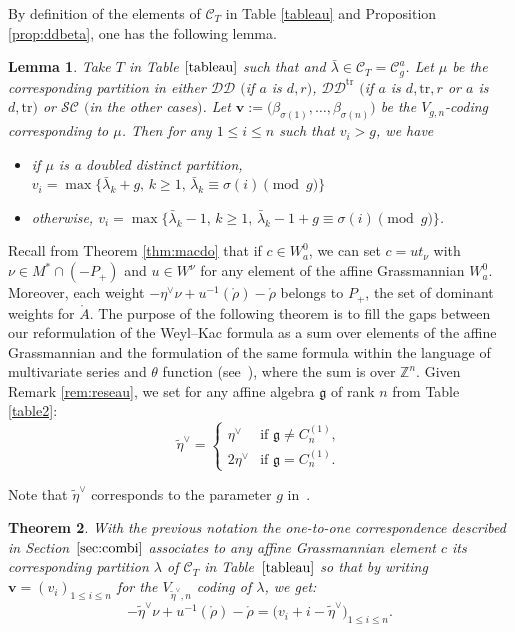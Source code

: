 \documentclass[10pt,a4paper]{amsart}
\newtheorem{Theorem}{Theorem}[section]
\newtheorem{Lemma}[Theorem]{Lemma}
\numberwithin{equation}{section}
\newcommand{\cC}{\mathcal{C}}
\def\ccsc{\mathcal {SC}}
\def\ccdd{\mathcal {DD}}
\newcommand{\Z}{\mathbb{Z}}
\begin{document}
By definition of the elements of $\cC_T$ in Table \ref{tableau} and Proposition \ref{prop:ddbeta}, one has the following lemma.

\begin{Lemma}%
Take $T$ in Table $\ref{tableau}$ such that  and $\bar{\lambda}\in\cC_T=\cC_{g}^{a}$. Let $\mu$ be the corresponding partition in either $\ccdd$ $($if $a$ is $d,r)$, $\ccdd^{\mathrm{tr}}$ $($if $a$ is $d,\mathrm{tr},r$ or $a$ is $d,\mathrm{tr})$ or $\ccsc$ $($in the other cases$)$. Let $\mathbf{v}:=\bigl(\beta_{\sigma(1)},\dots,\beta_{\sigma(n)}\bigr)$ be the $V_{g,n}$-coding corresponding to $\mu$. Then for any $1\leq i\leq n$ such that $v_i>g$, we have
\begin{itemize}\itemsep=0pt
\item if $\mu$ is a doubled distinct partition, $v_i=\max\bigl\lbrace \bar{\lambda}_k+g,\, k\geq 1,\,\bar{\lambda}_k\equiv \sigma(i)\pmod{g} \bigr\rbrace$
\item otherwise, $v_i=\max\lbrace \bar{\lambda}_k-1,\, k\geq 1,\,\bar{\lambda}_k-1+g\equiv \sigma(i)\pmod{g} \rbrace$.

\end{itemize}
\end{Lemma}

Recall from Theorem \ref{thm:macdo} that if $c\in W_{a}^{0}$, we can set $c=ut_{\nu}$ with $\nu\in M^{*}\cap(-P_{+})$ and $u\in W^{\nu}$ for
any element of the affine Grassmannian $W_{a}^{0}$. Moreover, each weight $%
-\eta^{\vee}\nu+u^{-1}(\mathring{\rho})-\mathring{\rho}$ belongs to $P_{+}$,
the set of dominant weights for $\mathring{A}$. The purpose of the following theorem is to fill the gaps between our reformulation of the Weyl--Kac formula as a sum over elements of the affine Grassmannian and the formulation of the same formula within the language of multivariate series and $\theta$ function (see~\cite[Proposition $6.1$]{RS}), where the sum is over $\Z^n$. Given Remark \ref{rem:reseau}, we set for any affine algebra $\mathfrak{g}$ of rank $n$ from Table \ref{table2}:
\[\tilde{\eta}^{\vee}=\begin{cases} \eta^{\vee} &\text{if } \mathfrak{g}\neq C_n^{(1)},\\
2 \eta^{\vee} &\text{if } \mathfrak{g}= C_n^{(1)}.\end{cases}\]

Note that $\tilde{\eta}^{\vee}$ corresponds to the parameter $g$ in~\cite{Mac,Wmac}.


\begin{Theorem}%
With the previous notation the one-to-one correspondence described in Section~$\ref{sec:combi}$ associates to any affine Grassmannian element $c$ its corresponding partition $\lambda$ of $\cC_T$ in Table~$\ref{tableau}$ so that by writing $\mathbf{v}=(v_i)_{1\leq i\leq n}$ for the $V_{\tilde{\eta}^{\vee},n}$ coding of $\lambda$, we get:
\[-\tilde{\eta}^{\vee}\nu+u^{-1}(\mathring{\rho})-\mathring{\rho}=\bigl(v_i+i-\tilde{\eta}^{\vee}\bigr)_{1\leq i\leq n}.\]
\end{Theorem}
\end{document}

